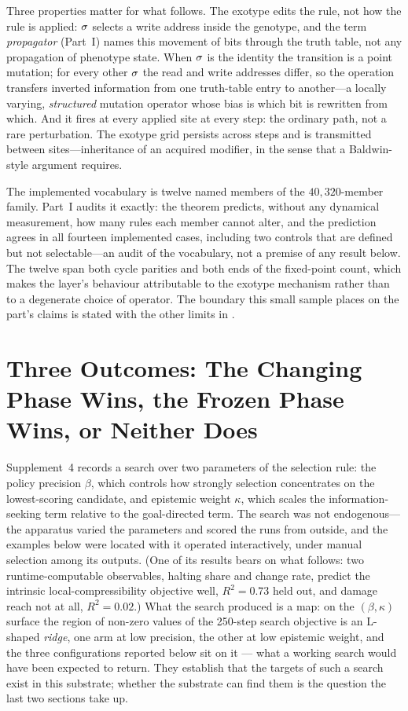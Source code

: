 Three properties matter for what follows. The exotype edits the rule, not
how the rule is applied: $\sigma$ selects a write address inside the genotype,
and the term \emph{propagator} (Part~I) names this movement of bits through
the truth table, not any propagation of phenotype state. When $\sigma$ is the
identity the transition is a point mutation; for every other $\sigma$ the read
and write addresses differ, so the operation transfers inverted information
from one truth-table entry to another---a locally varying, \emph{structured}
mutation operator whose bias is which bit is rewritten from which. And it
fires at every applied site at every step: the ordinary path, not a rare
perturbation. The exotype grid persists across steps and is transmitted
between sites---inheritance of an acquired modifier, in the sense that a
Baldwin-style argument requires.

The implemented vocabulary is twelve named members of the
$40{,}320$-member family.\label{sec:exotype-vocabulary}%
\label{sec:exotype-scope} Part~I audits it exactly: the
theorem predicts, without any dynamical measurement, how many rules each
member cannot alter, and the prediction agrees in all fourteen implemented
cases, including two controls that are defined but not selectable---an audit
of the vocabulary, not a premise of any result below. The twelve span both
cycle parities and both ends of the fixed-point count, which makes the
layer's behaviour attributable to the exotype mechanism rather than to a
degenerate choice of operator. The boundary this small sample places on the
part's claims is stated with the other limits in .

\section{Three Outcomes: The Changing Phase Wins, the Frozen Phase Wins, or Neither Does}
\label{sec:exotype-examples}

Supplement~4 records a search over two parameters of the selection rule: the
policy precision $\beta$, which controls how strongly selection concentrates on the lowest-scoring candidate, and epistemic weight $\kappa$, which scales the information-seeking term relative to the goal-directed term. The search was
not endogenous---the apparatus varied the parameters and scored the runs
from outside, and the examples below were located with it operated
interactively, under manual selection among its outputs. (One of its
results bears on what follows: two runtime-computable observables, halting share and change rate,
predict the intrinsic local-compressibility objective well, $R^2 = 0.73$ held out, and damage reach
not at all, $R^2 = 0.02$.) What the search produced is a map: on the
$(\beta,\kappa)$ surface the region of non-zero values of the 250-step search objective is an
L-shaped \emph{ridge}, one arm at low precision, the other at low epistemic
weight, and the three configurations reported below sit on it --- what a
working search would have been expected to return. They establish that the targets of such a search
exist in this substrate; whether the substrate can find them is the question
the last two sections take up.

